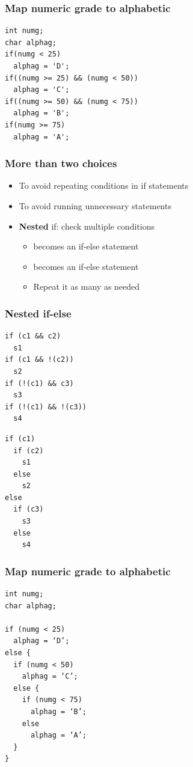\documentclass{../c-lecture}
\begin{document}
\begin{frame}[fragile]
  \frametitle{Map numeric grade to alphabetic}
  \begin{verbatim}
int numg;
char alphag;
if(numg < 25)
  alphag = 'D';
if((numg >= 25) && (numg < 50))
  alphag = 'C';
if((numg >= 50) && (numg < 75))
  alphag = 'B';
if(numg >= 75)
  alphag = 'A';
  \end{verbatim}
\end{frame}

\begin{frame}
  \frametitle{More than two choices}
  \begin{itemize}
    \item To avoid repeating conditions in if statements
    \item To avoid running unnecessary statements
    \item \textbf{\color{RubineRed} Nested} if: check multiple conditions
    \begin{itemize}
      \item <Statements 1> becomes an if-else statement
      \item <Statements 2> becomes an if-else statement
      \item Repeat it as many as needed
    \end{itemize}
  \end{itemize}
\end{frame}

\begin{frame}[fragile]
  \frametitle{Nested if-else}
  \scriptsize
  \begin{verbatim}
if (c1 && c2)
  s1
if (c1 && !(c2))
  s2
if (!(c1) && c3)
  s3
if (!(c1) && !(c3))
  s4
  \end{verbatim}
  \scriptsize
  \begin{verbatim}
if (c1)
  if (c2)
    s1
  else
    s2
else
  if (c3)
    s3
  else
    s4
  \end{verbatim}
\end{frame}

\begin{frame}[fragile]
  \frametitle{Map numeric grade to alphabetic}
  \scriptsize
  \begin{verbatim}
int numg;
char alphag;

if (numg < 25)
  alphag = ‘D’;
else {
  if (numg < 50)
    alphag = ‘C’;
  else {
    if (numg < 75)
      alphag = ‘B’;
    else
      alphag = ‘A’;
  }
}
  \end{verbatim}
\end{frame}
\end{document}
